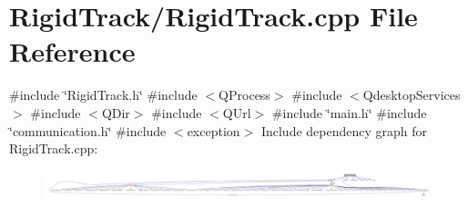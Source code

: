 \section{Rigid\+Track/\+Rigid\+Track.cpp File Reference}
\label{_rigid_track_8cpp}
{\ttfamily \#include \char`\"{}Rigid\+Track.\+h\char`\"{}}\newline
{\ttfamily \#include $<$Q\+Process$>$}\newline
{\ttfamily \#include $<$Qdesktop\+Services$>$}\newline
{\ttfamily \#include $<$Q\+Dir$>$}\newline
{\ttfamily \#include $<$Q\+Url$>$}\newline
{\ttfamily \#include \char`\"{}main.\+h\char`\"{}}\newline
{\ttfamily \#include \char`\"{}communication.\+h\char`\"{}}\newline
{\ttfamily \#include $<$exception$>$}\newline
Include dependency graph for Rigid\+Track.\+cpp\+:\nopagebreak
\begin{figure}[H]
\begin{center}
\leavevmode
\includegraphics[width=350pt]{_rigid_track_8cpp__incl}
\end{center}
\end{figure}

